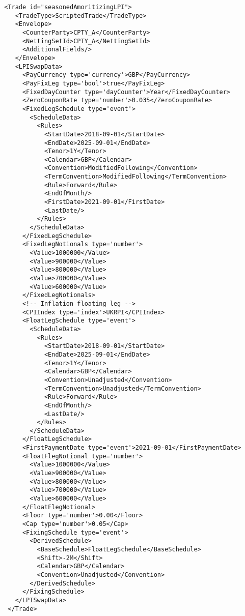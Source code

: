\begin{verbatim} 
 <Trade id="seasonedAmoritizingLPI">
    <TradeType>ScriptedTrade</TradeType>
    <Envelope>
      <CounterParty>CPTY_A</CounterParty>
      <NettingSetId>CPTY_A</NettingSetId>
      <AdditionalFields/>
    </Envelope>
    <LPISwapData>
      <PayCurrency type='currency'>GBP</PayCurrency>
      <PayFixLeg type='bool'>true</PayFixLeg>
      <FixedDayCounter type='dayCounter'>Year</FixedDayCounter>
      <ZeroCouponRate type='number'>0.035</ZeroCouponRate>
      <FixedLegSchedule type='event'>
        <ScheduleData>
          <Rules>
            <StartDate>2018-09-01</StartDate>
            <EndDate>2025-09-01</EndDate>
            <Tenor>1Y</Tenor>
            <Calendar>GBP</Calendar>
            <Convention>ModifiedFollowing</Convention>
            <TermConvention>ModifiedFollowing</TermConvention>
            <Rule>Forward</Rule>
            <EndOfMonth/>
            <FirstDate>2021-09-01</FirstDate>
            <LastDate/>
          </Rules>
        </ScheduleData>
      </FixedLegSchedule>
      <FixedLegNotionals type='number'>
        <Value>1000000</Value>
        <Value>900000</Value>
        <Value>800000</Value>
        <Value>700000</Value>
        <Value>600000</Value>
      </FixedLegNotionals>
      <!-- Inflation floating leg -->
      <CPIIndex type='index'>UKRPI</CPIIndex>
      <FloatLegSchedule type='event'>
        <ScheduleData>
          <Rules>
            <StartDate>2018-09-01</StartDate>
            <EndDate>2025-09-01</EndDate>
            <Tenor>1Y</Tenor>
            <Calendar>GBP</Calendar>
            <Convention>Unadjusted</Convention>
            <TermConvention>Unadjusted</TermConvention>
            <Rule>Forward</Rule>
            <EndOfMonth/>
            <LastDate/>
          </Rules>
        </ScheduleData>
      </FloatLegSchedule>
      <FirstPaymentDate type='event'>2021-09-01</FirstPaymentDate>
      <FloatFlegNotional type='number'>
        <Value>1000000</Value>
        <Value>900000</Value>
        <Value>800000</Value>
        <Value>700000</Value>
        <Value>600000</Value>
      </FloatFlegNotional>
      <Floor type='number'>0.00</Floor>
      <Cap type='number'>0.05</Cap>
      <FixingSchedule type='event'>
        <DerivedSchedule>
          <BaseSchedule>FloatLegSchedule</BaseSchedule>
          <Shift>-2M</Shift>
          <Calendar>GBP</Calendar>
          <Convention>Unadjusted</Convention>
        </DerivedSchedule>
      </FixingSchedule>
    </LPISwapData>
  </Trade>
\end{verbatim}

